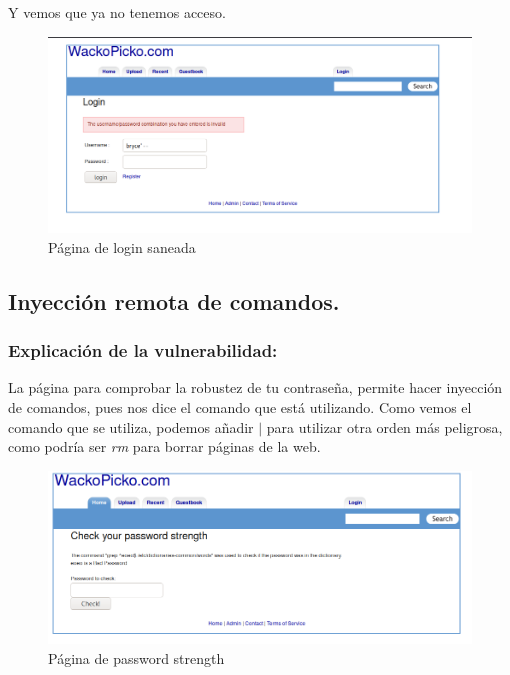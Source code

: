 \documentclass[12pt,twoside]{article}
\begin{document}
Y vemos que ya no tenemos acceso. 
\begin{figure}[H]
    \centering
    \includegraphics[scale=0.45]{./imagenes/login_saneado}
    \caption{Página de login saneada}
\end{figure}


\subsection{Inyección remota de comandos.}
\subsubsection*{Explicación de la vulnerabilidad:}
La página para comprobar la robustez de tu contraseña, permite hacer inyección de comandos, pues nos dice el comando que está utilizando. 
Como vemos el comando que se utiliza, podemos añadir $\vert$ para utilizar otra orden más peligrosa, como podría ser \textit{rm} para borrar páginas de la web.
\begin{figure}[H]
    \centering
    \includegraphics[scale=0.45]{./imagenes/command_injection_1}
    \caption{Página de password strength}
\end{figure}
\end{document}
